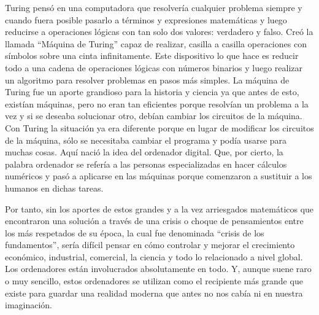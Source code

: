\documentclass[11pt,letterpaper]{article}
\begin{document}
Turing pensó en una computadora que resolvería cualquier problema siempre y cuando fuera posible pasarlo a términos y expresiones matemáticas y luego reducirse a operaciones lógicas con tan solo dos valores: verdadero y falso. 
Creó la llamada “Máquina de Turing” capaz de realizar, casilla a casilla operaciones con símbolos sobre una cinta infinitamente. Este dispositivo lo que hace es reducir todo a una cadena de operaciones lógicas con números binarios y luego realizar un algoritmo para resolver problemas en pasos más simples. 
La máquina de Turing fue un aporte grandioso para la historia y ciencia ya que antes de esto, existían máquinas, pero no eran tan eficientes porque resolvían un problema a la vez y si se deseaba solucionar otro, debían cambiar los circuitos de la máquina. Con Turing la situación ya era diferente porque en lugar de modificar los circuitos de la máquina, sólo se necesitaba cambiar el programa y podía usarse para muchas cosas. Aquí nació la idea del ordenador digital. Que, por cierto, la palabra ordenador se refería a las personas especializadas en hacer cálculos numéricos y pasó a aplicarse en las máquinas porque comenzaron a sustituir a los humanos en dichas tareas. 

\vspace{10PT}
Por tanto, sin los aportes de estos grandes y a la vez arriesgados matemáticos que encontraron una solución a través de una crisis o choque de pensamientos entre los más respetados de su época, la cual fue denominada “crisis de los fundamentos”, sería difícil pensar en cómo controlar y mejorar el crecimiento económico, industrial, comercial, la ciencia y todo lo relacionado a nivel global. Los ordenadores están involucrados absolutamente en todo.
Y, aunque suene raro o muy sencillo, estos ordenadores se utilizan como el recipiente más grande que existe para guardar una realidad moderna que antes no nos cabía ni en nuestra imaginación.



\end{document}
